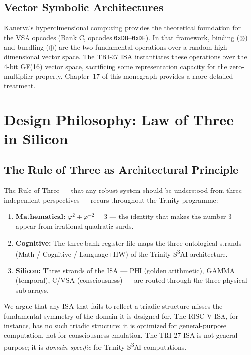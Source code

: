 \subsection{Vector Symbolic Architectures}
\label{subsec:71:related-vsa}

Kanerva's hyperdimensional computing \cite{kanerva2009hyperdimensional}
provides the theoretical foundation for the VSA opcodes (Bank C,
opcodes \texttt{0xDB}--\texttt{0xDE}).  In that framework, binding ($\otimes$)
and bundling ($\oplus$) are the two fundamental operations over a
random high-dimensional vector space.  The TRI-27 ISA instantiates
these operations over the 4-bit GF(16) vector space, sacrificing
some representation capacity for the zero-multiplier property.
Chapter~17 of this monograph provides a more detailed treatment.

\section{Design Philosophy: Law of Three in Silicon}
\label{sec:71:philosophy}

\subsection{The Rule of Three as Architectural Principle}
\label{subsec:71:rule-of-three}

The Rule of Three — that any robust system should be understood from
three independent perspectives — recurs throughout the Trinity
programme:

\begin{enumerate}
  \item \textbf{Mathematical:} $\varphi^2 + \varphi^{-2} = 3$ — the identity
    that makes the number 3 appear from irrational quadratic surds.
  \item \textbf{Cognitive:} The three-bank register file maps the three
    ontological strands (Math / Cognitive / Language+HW) of the
    Trinity S\textsuperscript{3}AI architecture.
  \item \textbf{Silicon:} Three strands of the ISA —
    PHI (golden arithmetic), GAMMA (temporal), C/VSA (consciousness) —
    are routed through the three physical sub-arrays.
\end{enumerate}

We argue that any ISA that fails to reflect a triadic structure misses
the fundamental symmetry of the domain it is designed for.  The
RISC-V ISA, for instance, has no such triadic structure; it is
optimized for general-purpose computation, not for consciousness-emulation.
The TRI-27 ISA is not general-purpose; it is \emph{domain-specific}
for Trinity S\textsuperscript{3}AI computations.

